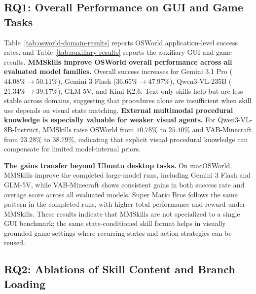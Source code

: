 \subsection{RQ1: Overall Performance on GUI and Game Tasks}
\label{sec:experiments-desktop}

Table~\ref{tab:osworld-domain-results} reports OSWorld application-level success rates, and Table~\ref{tab:auxiliary-results} reports the auxiliary GUI and game results. \textbf{MMSkills improve OSWorld overall performance across all evaluated model families.} Overall success increases for Gemini 3.1 Pro ($44.08\%\!\to\!50.11\%$), Gemini 3 Flash ($36.65\%\!\to\!47.97\%$), Qwen3-VL-235B ($21.34\%\!\to\!39.17\%$), GLM-5V, and Kimi-K2.6. Text-only skills help but are less stable across domains, suggesting that procedures alone are insufficient when skill use depends on visual state matching. \textbf{External multimodal procedural knowledge is especially valuable for weaker visual agents.} For Qwen3-VL-8B-Instruct, MMSkills raise OSWorld from $10.78\%$ to $25.40\%$ and VAB-Minecraft from $23.28\%$ to $38.79\%$, indicating that explicit visual procedural knowledge can compensate for limited model-internal priors.

\textbf{The gains transfer beyond Ubuntu desktop tasks.} On macOSWorld, MMSkills improve the completed large-model runs, including Gemini 3 Flash and GLM-5V, while VAB-Minecraft shows consistent gains in both success rate and average score across all evaluated models. Super Mario Bros follows the same pattern in the completed runs, with higher total performance and reward under MMSkills. These results indicate that MMSkills are not specialized to a single GUI benchmark; the same state-conditioned skill format helps in visually grounded game settings where recurring states and action strategies can be reused.

\subsection{RQ2: Ablations of Skill Content and Branch Loading}
\label{sec:experiments-ablation}

